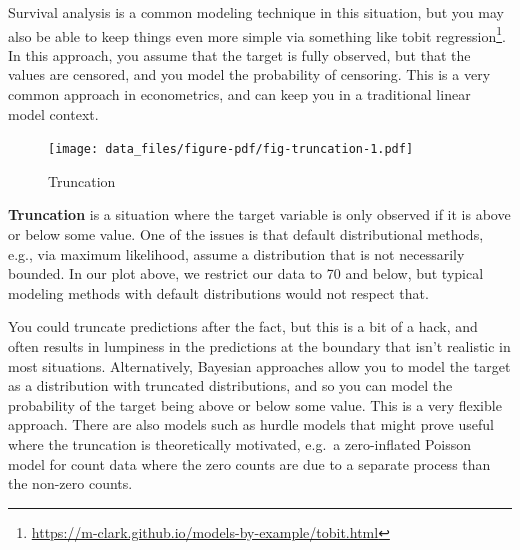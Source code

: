 \documentclass[
  letterpaper,
]{krantz}
\DeclareRobustCommand{\href}[2]{#2\footnote{\url{#1}}}
\begin{document}
Survival analysis is a common modeling technique in this situation, but
you may also be able to keep things even more simple via something like
\href{https://m-clark.github.io/models-by-example/tobit.html}{tobit
regression}. In this approach, you assume that the target is fully
observed, but that the values are censored, and you model the
probability of censoring. This is a very common approach in
econometrics, and can keep you in a traditional linear model context.

\begin{figure}

{\centering \texttt{[image: data\_files/figure-pdf/fig-truncation-1.pdf]}

}

\caption{\label{fig-truncation}Truncation}

\end{figure}

\textbf{Truncation} is a situation where the target variable is only
observed if it is above or below some value. One of the issues is that
default distributional methods, e.g., via maximum likelihood, assume a
distribution that is not necessarily bounded. In our plot above, we
restrict our data to 70 and below, but typical modeling methods with
default distributions would not respect that.

You could truncate predictions after the fact, but this is a bit of a
hack, and often results in lumpiness in the predictions at the boundary
that isn't realistic in most situations. Alternatively, Bayesian
approaches allow you to model the target as a distribution with
truncated distributions, and so you can model the probability of the
target being above or below some value. This is a very flexible
approach. There are also models such as hurdle models that might prove
useful where the truncation is theoretically motivated, e.g.~a
zero-inflated Poisson model for count data where the zero counts are due
to a separate process than the non-zero counts.
\end{document}

